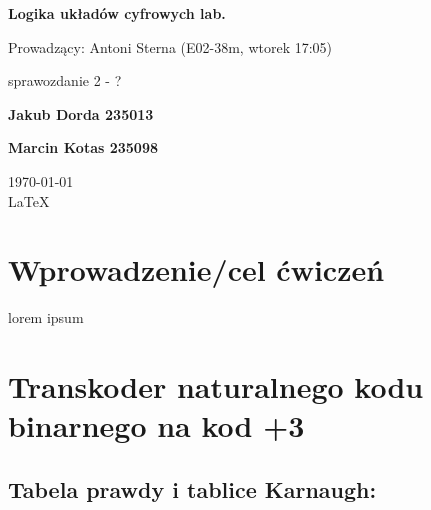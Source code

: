 \documentclass[12pt,a4paper]{article}
\begin{document}
	
	\begin{titlepage}
		
		\centering
		{\huge\bfseries Logika układów cyfrowych lab.\par}
		
		\vspace{0.5cm}
		Prowadzący: Antoni Sterna (E02-38m, wtorek 17:05) \\
	
		\vspace{1.1cm}
		{\Large sprawozdanie 2 - ?\par}
		\vfill
		
		{\large\bfseries Jakub Dorda 235013\par}
		{\large\bfseries Marcin Kotas 235098\par}
		
		\vspace{1cm}
		\today \\ \LaTeX
		
		\restoregeometry
	\end{titlepage}

	
	\section{Wprowadzenie/cel ćwiczeń}
	
		lorem ipsum
	
	\section{Transkoder naturalnego kodu binarnego na kod +3}
		
		\subsection{Tabela prawdy i tablice Karnaugh:}
			
\end{document}
